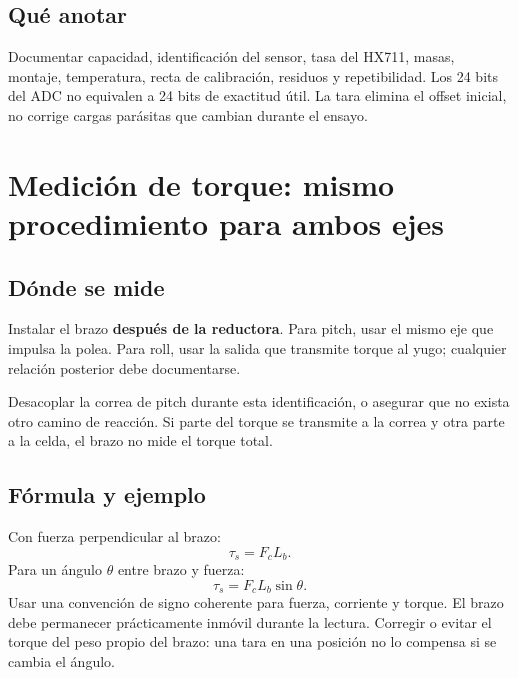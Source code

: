 \documentclass[11pt,a4paper]{article}
\begin{document}
\subsection{Qué anotar}
Documentar capacidad, identificación del sensor, tasa del HX711, masas, montaje, temperatura, recta de calibración, residuos y repetibilidad. Los 24 bits del ADC no equivalen a 24 bits de exactitud útil. La tara elimina el offset inicial, no corrige cargas parásitas que cambian durante el ensayo.

\section{Medición de torque: mismo procedimiento para ambos ejes}
\subsection{Dónde se mide}
Instalar el brazo \textbf{después de la reductora}. Para pitch, usar el mismo eje que impulsa la polea. Para roll, usar la salida que transmite torque al yugo; cualquier relación posterior debe documentarse.

Desacoplar la correa de pitch durante esta identificación, o asegurar que no exista otro camino de reacción. Si parte del torque se transmite a la correa y otra parte a la celda, el brazo no mide el torque total.

\begin{center}
\end{center}

\subsection{Fórmula y ejemplo}
Con fuerza perpendicular al brazo:
\begin{equation}
\boxed{\tau_s=F_cL_b.}
\end{equation}
Para un ángulo $\theta$ entre brazo y fuerza:
\begin{equation}
\tau_s=F_cL_b\sin\theta.
\end{equation}
Usar una convención de signo coherente para fuerza, corriente y torque. El brazo debe permanecer prácticamente inmóvil durante la lectura. Corregir o evitar el torque del peso propio del brazo: una tara en una posición no lo compensa si se cambia el ángulo.
\end{document}
